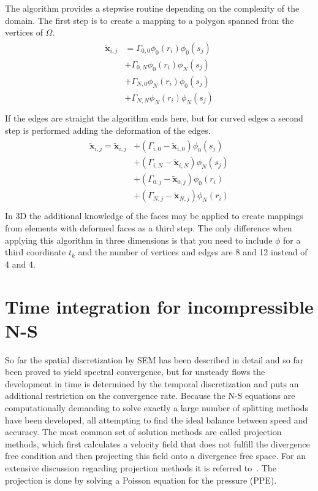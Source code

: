 The algorithm provides a stepwise routine depending on the complexity of the domain. The first step is to create 
a mapping to a polygon spanned from the vertices of $\Omega$.
%
\begin{align}
    \begin{split}
    \mathbf{\tilde{x}}_{i,j} 
             &=\Gamma_{0,0}\phi_0(r_i)\phi_0(s_j)\\
             &+\Gamma_{0,N}\phi_0(r_i)\phi_N(s_j)\\
             &+\Gamma_{N,0}\phi_N(r_i)\phi_0(s_j)\\
             &+\Gamma_{N,N}\phi_N(r_i)\phi_N(s_j)\\
    \end{split}
    \label{eq:gh1}
\end{align}
%
If the edges are straight the algorithm ends here, but for curved edges a second step is performed adding 
the deformation of the edges.
%
\begin{align}
    \begin{split}
        \mathbf{\tilde{x}}_{i,j}  = \mathbf{\tilde{x}}_{i,j} 
             &+(\Gamma_{i,0}-\mathbf{\tilde{x}}_{i,0})\phi_0(s_j)\\
             &+(\Gamma_{i,N}-\mathbf{\tilde{x}}_{i,N})\phi_N(s_j)\\
             &+(\Gamma_{0,j}-\mathbf{\tilde{x}}_{0,j})\phi_0(r_i)\\
             &+(\Gamma_{N,j}-\mathbf{\tilde{x}}_{N,j})\phi_N(r_i)\\
    \end{split}
    \label{eq:gh1}
\end{align}
%
In 3D the additional knowledge of the faces may be applied to create mappings from elements with deformed faces as a 
third step. The only difference when applying this algorithm in three dimensions is that you need to include $\phi$
for a third coordinate $t_k$ and the number of vertices and edges are 8 and 12 instead of 
4 and 4.



\section{Time integration for incompressible N-S} \label{timeNS}

So far the spatial discretization by SEM has been described in detail and so far been proved to yield spectral convergence,
but for unsteady flows the development in time is determined by the temporal discretization and puts an additional 
restriction on the convergence rate. Because the N-S equations are computationally demanding to solve exactly 
a large number of splitting methods have been developed, all attempting to find the ideal balance between speed 
and accuracy. The most common set of solution methods are called projection methods, which first calculates 
a velocity field that does not fulfill the divergence free condition and then projecting this field onto a 
divergence free space. For an extensive discussion regarding projection methods it is referred to~\cite{Guermond2006}.
The projection is done by solving a Poisson equation for the pressure (PPE). 

